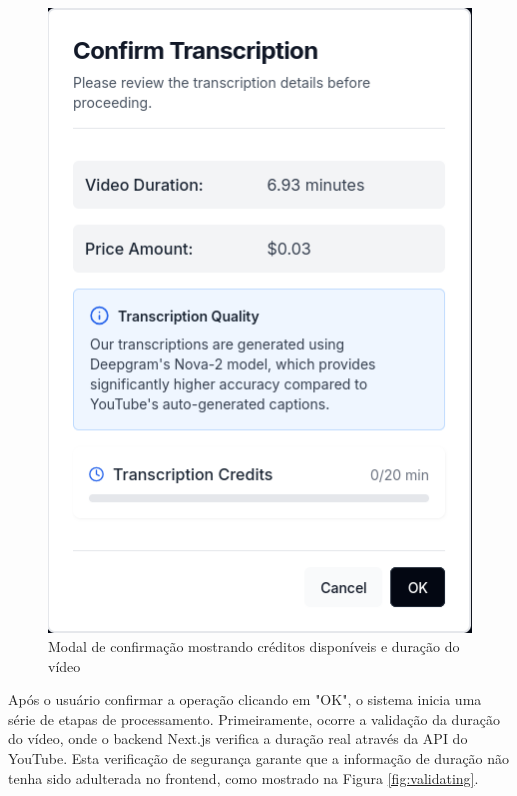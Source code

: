 \documentclass[tcc,capa]{texufpel}
\begin{document}
\begin{figure}[H]
  \centering
  \includegraphics[width=\textwidth,height=0.45\textheight,keepaspectratio]{exemplo-slides/graphics/images/transcription-modal.png}
  \caption{Modal de confirmação mostrando créditos disponíveis e duração do vídeo}
  \label{fig:Transcription Modal}
\end{figure}

Após o usuário confirmar a operação clicando em "OK", o sistema inicia uma série de etapas de processamento. Primeiramente, ocorre a validação da duração do vídeo, onde o backend Next.js verifica a duração real através da API do YouTube. Esta verificação de segurança garante que a informação de duração não tenha sido adulterada no frontend, como mostrado na Figura \ref{fig:validating}.
\end{document}

